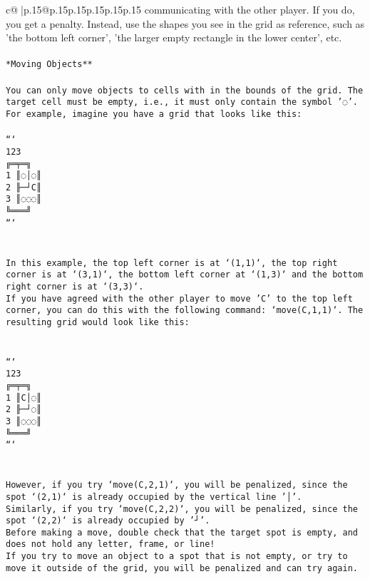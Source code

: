 \documentclass{article}
\begin{document}
{\begin{supertabular}{c@{$\;$}|p{.15\linewidth}@{}p{.15\linewidth}p{.15\linewidth}p{.15\linewidth}p{.15\linewidth}p{.15\linewidth}}
{{{communicating with the other player. If you do, you get a penalty. Instead, use the shapes you see in the grid as reference, such as 'the bottom left corner', 'the larger empty rectangle in the lower center', etc.\\ \tt \\ \tt **Moving Objects**\\ \tt \\ \tt * You can only move objects to cells with in the bounds of the grid. The target cell must be empty, i.e., it must only contain the symbol '◌'.\\ \tt * For example, imagine you have a grid that looks like this: \\ \tt \\ \tt ```\\ \tt     123\\ \tt    ╔═╤═╗\\ \tt  1 ║◌│◌║\\ \tt  2 ╟─┘C║\\ \tt  3 ║◌◌◌║\\ \tt    ╚═══╝\\ \tt ```\\ \tt \\ \tt \\ \tt * In this example, the top left corner is at `(1,1)`, the top right corner is at `(3,1)`, the bottom left corner at `(1,3)` and the bottom right corner is at `(3,3)`.\\ \tt * If you have agreed with the other player to move 'C' to the top left corner, you can do this with the following command: `move(C,1,1)`. The resulting grid would look like this: \\ \tt \\ \tt \\ \tt ```\\ \tt     123\\ \tt    ╔═╤═╗\\ \tt  1 ║C│◌║\\ \tt  2 ╟─┘◌║\\ \tt  3 ║◌◌◌║\\ \tt    ╚═══╝\\ \tt ```\\ \tt \\ \tt \\ \tt * However, if you try `move(C,2,1)`, you will be penalized, since the spot `(2,1)` is already occupied by the vertical line '│'.\\ \tt * Similarly, if you try `move(C,2,2)`, you will be penalized, since the spot `(2,2)` is already occupied by '┘'.\\ \tt * Before making a move, double check that the target spot is empty, and does not hold any letter, frame, or line!\\ \tt * If you try to move an object to a spot that is not empty, or try to move it outside of the grid, you will be penalized and can try again.\\ \tt \\ \tt \\ }}}
\end{supertabular}}
\end{document}
